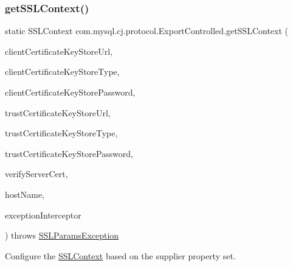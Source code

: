 \subsubsection{\texorpdfstring{get\+S\+S\+L\+Context()}{getSSLContext()}\hspace{0.1cm}{\footnotesize\ttfamily [1/2]}}
{\footnotesize\ttfamily static S\+S\+L\+Context com.\+mysql.\+cj.\+protocol.\+Export\+Controlled.\+get\+S\+S\+L\+Context (\begin{DoxyParamCaption}\item[{String}]{client\+Certificate\+Key\+Store\+Url,  }\item[{String}]{client\+Certificate\+Key\+Store\+Type,  }\item[{String}]{client\+Certificate\+Key\+Store\+Password,  }\item[{String}]{trust\+Certificate\+Key\+Store\+Url,  }\item[{String}]{trust\+Certificate\+Key\+Store\+Type,  }\item[{String}]{trust\+Certificate\+Key\+Store\+Password,  }\item[{boolean}]{verify\+Server\+Cert,  }\item[{String}]{host\+Name,  }\item[{\mbox{\hyperlink{interfacecom_1_1mysql_1_1cj_1_1exceptions_1_1_exception_interceptor}{Exception\+Interceptor}}}]{exception\+Interceptor }\end{DoxyParamCaption}) throws \mbox{\hyperlink{classcom_1_1mysql_1_1cj_1_1exceptions_1_1_s_s_l_params_exception}{S\+S\+L\+Params\+Exception}}\hspace{0.3cm}{\ttfamily [static]}}

Configure the \mbox{\hyperlink{}{S\+S\+L\+Context}} based on the supplier property set. \mbox{\label{classcom_1_1mysql_1_1cj_1_1protocol_1_1_export_controlled_a181c1aa6b05dafc3ddf3b2943da64c0b}} 
